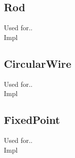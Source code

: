 \subsection{Rod}
Used for..\\
Impl\\

\subsection{CircularWire}
Used for..\\
Impl\\

\subsection{FixedPoint}
Used for..\\
Impl\\
